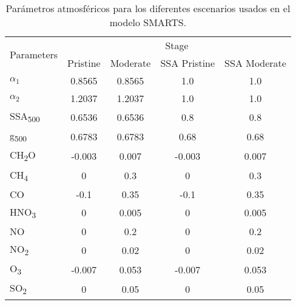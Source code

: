 \begin{table}[H]
    \centering
    \begin{tabular}{lcccc}
        \hline
        \multicolumn{1}{c}{\multirow{2}{*}{Parameters}} & \multicolumn{4}{c}{Stage}                                          \\ \cline{2-5}
        \multicolumn{1}{c}{}                            & Pristine                  & Moderate & SSA Pristine & SSA Moderate \\ \hline
        $\alpha_1$                                      & 0.8565                    & 0.8565   & 1.0          & 1.0          \\
        $\alpha_2$                                      & 1.2037                    & 1.2037   & 1.0          & 1.0          \\
        SSA\textsubscript{500}                          & 0.6536                    & 0.6536   & 0.8          & 0.8          \\
        g\textsubscript{500}                            & 0.6783                    & 0.6783   & 0.68         & 0.68         \\
        CH\textsubscript{2}O                            & -0.003                    & 0.007    & -0.003       & 0.007        \\
        CH\textsubscript{4}                             & 0                         & 0.3      & 0            & 0.3          \\
        CO                                              & -0.1                      & 0.35     & -0.1         & 0.35         \\
        HNO\textsubscript{3}                            & 0                         & 0.005    & 0            & 0.005        \\
        NO                                              & 0                         & 0.2      & 0            & 0.2          \\
        NO\textsubscript{2}                             & 0                         & 0.02     & 0            & 0.02         \\
        O\textsubscript{3}                              & -0.007                    & 0.053    & -0.007       & 0.053        \\
        SO\textsubscript{2}                             & 0                         & 0.05     & 0            & 0.05         \\ \hline
    \end{tabular}
    \caption{Parámetros atmosféricos para los diferentes escenarios usados en el modelo SMARTS.}
    \label{table:parameters}
\end{table}